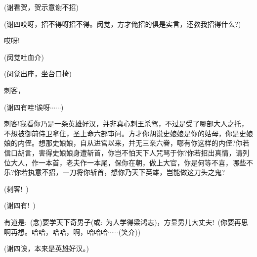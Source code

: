 {(谢看贺，贺示意谢不招)

(谢四\hspace{30pt}哎呀，招不得呀招不得。闵觉，方才俺招的俱是实言，还教我招得什么?)

哎呀!


(闵觉{\hwfs 吐血介})




(闵觉{\hwfs 出座}，{\hwfs 坐台口椅})


刺客，

(谢四\hspace{30pt}有哇!诶呀$\cdots{}\cdots{}$)

刺客!我看你乃是一条英雄好汉，并非真心刺王杀驾，不过是受了哪部大人之托，不想被御前侍卫拿住，圣上命六部审问。方才你胡说史娘娘是你的姑母，你是史娘娘的内侄。想那史娘娘，自从进宫以来，并无三亲六眷，哪有你这样的内侄?你若信口胡言，害得史娘娘身遭斩首，你岂不怕天下人咒骂于你?你若招出真情，请列位大人，作一本首，老夫作一本尾，保你在朝，做上大官，你是何等不喜，哪些不乐?你若执意不招，一刀将你斩首，想你乃天下英雄，岂能做这刀头之鬼?

(刺客!~)

(谢四\hspace{30pt}有!~)

有道是:~({\akai 念})要学天下奇男子({\akai 或}:~为人学得梁鸿志)，方显男儿大丈夫!~(你要再思啊再想。哈哈，哈哈，啊，哈哈哈$\cdots{}\cdots{}$({\hwfs 笑介}))


(谢四\hspace{30pt}诶，本来是英雄好汉。)



}
